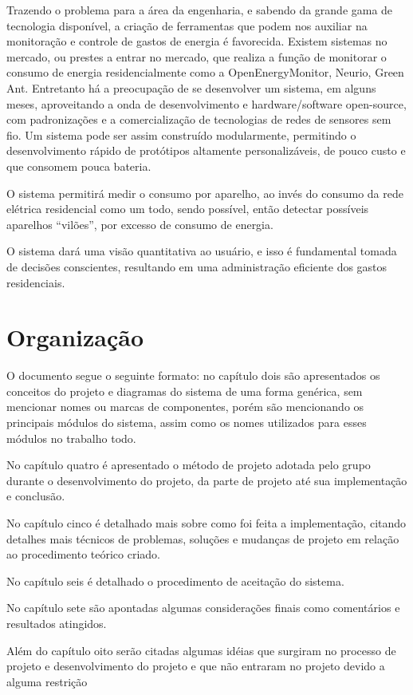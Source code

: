 Trazendo o problema para a área da engenharia, e sabendo da grande gama de tecnologia disponível, a criação de ferramentas que podem nos auxiliar na monitoração e controle de gastos de energia é favorecida. Existem sistemas no mercado, ou prestes a entrar no mercado, que realiza a função de monitorar o consumo de energia residencialmente como a OpenEnergyMonitor\cite{open_energy_monitor}, Neurio\cite{neurio_site}, Green Ant\cite{green_ant_site}. Entretanto há a preocupação de se desenvolver um sistema, em alguns meses, aproveitando a onda de desenvolvimento e hardware/software open-source, com padronizações e a comercialização de tecnologias de redes de sensores sem fio. Um sistema pode ser assim construído modularmente, permitindo o desenvolvimento rápido de protótipos altamente personalizáveis, de pouco custo e que consomem pouca bateria.

O sistema permitirá medir o consumo por aparelho, ao invés do consumo da rede elétrica residencial como um todo, sendo possível, então detectar possíveis aparelhos “vilões”, por excesso de consumo de energia.

O sistema dará uma visão quantitativa ao usuário, e isso é fundamental tomada de decisões conscientes, resultando em uma administração eficiente dos gastos residenciais.

\section{Organização}
\label{Sec:organizacao}

O documento segue o seguinte formato: no capítulo dois são apresentados os conceitos do projeto e diagramas do sistema de uma forma genérica, sem mencionar nomes ou marcas de componentes, porém são mencionando os principais módulos do sistema, assim como os nomes utilizados para esses módulos no trabalho todo.

No capítulo quatro é apresentado o método de projeto adotada pelo grupo durante o desenvolvimento do projeto, da parte de projeto até sua implementação e conclusão.

No capítulo cinco é detalhado mais sobre como foi feita a implementação, citando detalhes mais técnicos de problemas, soluções e mudanças de projeto em relação ao procedimento teórico criado.

No capítulo seis é detalhado o procedimento de aceitação do sistema.

No capítulo sete são apontadas algumas considerações finais como comentários e resultados atingidos.

Além do capítulo oito serão citadas algumas idéias que surgiram no processo de projeto e desenvolvimento do projeto e que não entraram no projeto devido a alguma restrição